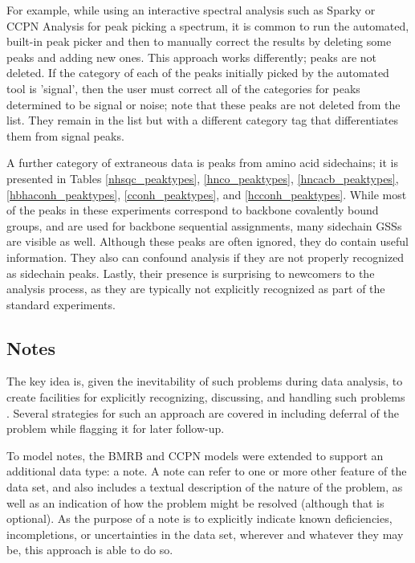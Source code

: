 For example, while using an interactive spectral analysis such as Sparky or
CCPN Analysis \cite{sparky, ccpn} for peak picking a spectrum, it is common
to run the automated, built-in peak picker and then to manually correct the
results by deleting some peaks and adding new ones.  This approach works
differently; peaks are not deleted.  If the category of each of the
peaks initially picked by the automated tool is 'signal', then the
user must correct all of the categories for peaks 
determined to be signal or noise; note that these peaks are not deleted
from the list.  They remain in the list but with a different category
tag that differentiates them from signal peaks.

A further category of extraneous data is peaks from amino acid sidechains; 
it is presented in Tables \ref{nhsqc_peaktypes}, \ref{hnco_peaktypes}, 
\ref{hncacb_peaktypes}, \ref{hbhaconh_peaktypes}, \ref{cconh_peaktypes}, and
\ref{hcconh_peaktypes}.  While most of the
peaks in these experiments correspond to backbone covalently bound groups, 
and are used for backbone sequential assignments, many sidechain GSSs are
visible as well.  Although these peaks are often ignored, they do contain
useful information.  They also can confound analysis if they are not properly
recognized as sidechain peaks.  Lastly, their presence is surprising to 
newcomers to the analysis process, as they are typically not explicitly 
recognized as part of the standard experiments.



\subsection*{Notes}
The key idea is, given the inevitability of such problems during data
analysis, to create facilities for explicitly recognizing, discussing, 
and handling such problems \cite{robillard2007concerns}. 
Several strategies for such an approach 
are covered in \cite{nuseibeh2000inconsistency} including deferral of the
problem while flagging it for later follow-up.

To model notes, the BMRB and CCPN models \cite{bmrb, ccpn} were extended
to support an additional data type: a note.  A note can refer to one or more
other feature of the data set, and also includes a textual description of
the nature of the problem, as well as an indication of how the problem might
be resolved (although that is optional).  As the purpose of a note is to
explicitly indicate known deficiencies, incompletions, or uncertainties in 
the data set, wherever and whatever they may be, this approach is able to do
so.

